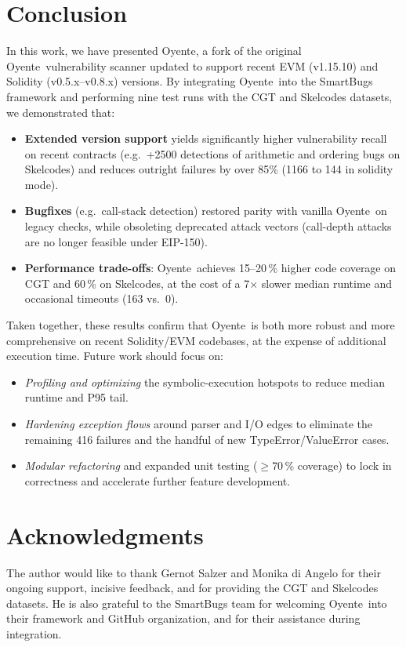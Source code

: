 \documentclass{article}
\newcommand\OY{Oyente}
\newcommand\OYp{\OY\raisebox{0.3ex}{\smaller +}}
\begin{document}
	\section{Conclusion}
	In this work, we have presented \OYp, a fork of the original \OY\ vulnerability scanner updated to support recent EVM (v1.15.10) and Solidity (v0.5.x–v0.8.x) versions.  By integrating \OYp\ into the SmartBugs framework and performing nine test runs with the CGT and Skelcodes datasets, we demonstrated that:

	\begin{itemize}
		\item \textbf{Extended version support} yields significantly higher vulnerability recall on recent contracts (e.g.\ +2500 detections of arithmetic and ordering bugs on Skelcodes) and reduces outright failures by over 85\% (1166 to 144 in solidity mode).
		\item \textbf{Bugfixes} (e.g.\ call-stack detection) restored parity with vanilla \OY\ on legacy checks, while obsoleting deprecated attack vectors (call-depth attacks are no longer feasible under EIP-150).
		\item \textbf{Performance trade-offs}: \OYp\ achieves 15–20\,\% higher code coverage on CGT and 60\,\% on Skelcodes, at the cost of a 7$\times$ slower median runtime and occasional timeouts (163 vs.\ 0).
	\end{itemize}

	Taken together, these results confirm that \OYp\ is both more robust and more comprehensive on recent Solidity/EVM codebases, at the expense of additional execution time. Future work should focus on:

	\begin{itemize}
		\item \emph{Profiling and optimizing} the symbolic-execution hotspots to reduce median runtime and P95 tail.
		\item \emph{Hardening exception flows} around parser and I/O edges to eliminate the remaining 416 failures and the handful of new TypeError/ValueError cases.
		\item \emph{Modular refactoring} and expanded unit testing ($\ge$70\,\% coverage) to lock in correctness and accelerate further feature development.
	\end{itemize}

	\section*{Acknowledgments}
	The author would like to thank Gernot Salzer and Monika di Angelo for their ongoing support, incisive feedback, and for providing the CGT and Skelcodes datasets.
	He is also grateful to the SmartBugs team for welcoming \OYp\ into their framework and GitHub organization, and for their assistance during integration.
\end{document}
